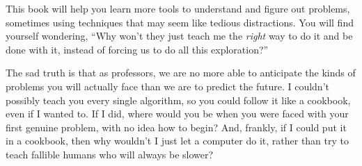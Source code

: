 \begin{itemize}
This book will help you learn more tools to understand and figure out
problems, sometimes using techniques that may seem like tedious
distractions.  You will find yourself wondering, ``Why won't they just
teach me the \emph{right} way to do it and be done with it, instead of
forcing us to do all this exploration?''

The sad truth is that as professors, we are no more able to anticipate
the kinds of problems you will actually face than we are to predict
the future.  I couldn't possibly teach you every single algorithm, so
you could follow it like a cookbook, even if I wanted to.  If I did,
where would you be when you were faced with your first genuine
problem, with no idea how to begin?  And, frankly, if I could put it
in a cookbook, then why wouldn't I just let a computer do it, rather
than try to teach fallible humans who will always be slower?
\end{itemize}










